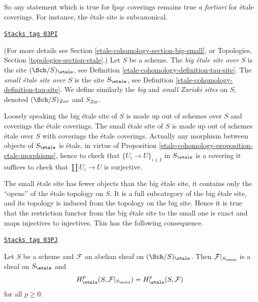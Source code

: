 So any statement which is true for fpqc coverings
remains true {\it a fortiori} for \'etale coverings. For
instance, the \'etale site is subcanonical.

\begin{definition}
\label{etale-cohomology-definition-big-etale-site}
\href{https://stacks.math.columbia.edu/tag/03PI}{\texttt{Stacks tag 03PI}}

(For more details see Section \ref{etale-cohomology-section-big-small}, or
Topologies, Section \ref{topologies-section-etale}.)
Let $S$ be a scheme.
The {\it big \'etale site over $S$} is the site
$(\Sch/S)_\etale$, see
Definition \ref{etale-cohomology-definition-tau-site}.
The {\it small \'etale site over $S$} is the site $S_\etale$, see
Definition \ref{etale-cohomology-definition-tau-site}.
We define similarly the {\it big} and {\it small Zariski sites} on $S$,
denoted $(\Sch/S)_{Zar}$ and $S_{Zar}$.
\end{definition}

Loosely speaking the big \'etale site of $S$ is made up out of schemes over $S$
and coverings the \'etale coverings. The small \'etale site of $S$ is made up
out of schemes \'etale over $S$ with coverings the \'etale coverings.
Actually any morphism between objects of $S_\etale$ is \'etale, in
virtue of
Proposition \ref{etale-cohomology-proposition-etale-morphisms},
hence to check that $\{U_i \to U\}_{i \in I}$ in $S_\etale$
is a covering it suffices to check that $\coprod U_i \to U$ is surjective.

\medskip\noindent
The small \'etale site has fewer objects than the big \'etale site, it
contains only the ``opens'' of the \'etale topology on $S$. It is a full
subcategory of the big \'etale site, and its topology is induced from the
topology on the big site. Hence it is true that the restriction functor
from the big \'etale site to the small one is exact and maps injectives to
injectives. This has the following consequence.

\begin{proposition}
\label{etale-cohomology-proposition-cohomology-restrict-small-site}
\href{https://stacks.math.columbia.edu/tag/03PJ}{\texttt{Stacks tag 03PJ}}

Let $S$ be a scheme and $\mathcal{F}$ an abelian sheaf on
$(\Sch/S)_\etale$.
Then $\mathcal{F}|_{S_\etale}$ is a sheaf on $S_\etale$ and
$$
H^p_\etale(S, \mathcal{F}|_{S_\etale}) =
H^p_\etale(S, \mathcal{F})
$$
for all $p \geq 0$.
\end{proposition}


